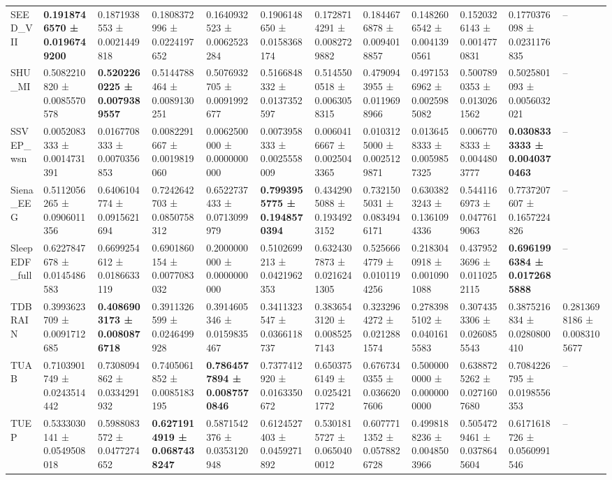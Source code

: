 \begin{table}[htbp]
\begin{tabular}{llllllllllll}
SEED_VII & \bfseries 0.1918746570 ± 0.0196749200 & 0.1871938553 ± 0.0021449818 & 0.1808372996 ± 0.0224197652 & 0.1640932523 ± 0.0062523284 & 0.1906148650 ± 0.0158368174 & 0.1728714291 ± 0.0082729882 & 0.1844676878 ± 0.0094018857 & 0.1482606542 ± 0.0041390561 & 0.1520326143 ± 0.0014770831 & 0.1770376098 ± 0.0231176835 & -- \\
SHU_MI & 0.5082210820 ± 0.0085570578 & \bfseries 0.5202260225 ± 0.0079389557 & 0.5144788464 ± 0.0089130251 & 0.5076932705 ± 0.0091992677 & 0.5166848332 ± 0.0137352597 & 0.5145500518 ± 0.0063058315 & 0.4790943955 ± 0.0119698966 & 0.4971536962 ± 0.0025985082 & 0.5007890353 ± 0.0130261562 & 0.5025801093 ± 0.0056032021 & -- \\
SSVEP_wsn & 0.0052083333 ± 0.0014731391 & 0.0167708333 ± 0.0070356853 & 0.0082291667 ± 0.0019819060 & 0.0062500000 ± 0.0000000000 & 0.0073958333 ± 0.0025558009 & 0.0060416667 ± 0.0025043365 & 0.0103125000 ± 0.0025129871 & 0.0136458333 ± 0.0059857325 & 0.0067708333 ± 0.0044803777 & \bfseries 0.0308333333 ± 0.0040370463 & -- \\
Siena_EEG & 0.5112056265 ± 0.0906011356 & 0.6406104774 ± 0.0915621694 & 0.7242642703 ± 0.0850758312 & 0.6522737433 ± 0.0713099979 & \bfseries 0.7993955775 ± 0.1948570394 & 0.4342905088 ± 0.1934923152 & 0.7321505031 ± 0.0834946171 & 0.6303823243 ± 0.1361094336 & 0.5441166973 ± 0.0477619063 & 0.7737207607 ± 0.1657224826 & -- \\
SleepEDF_full & 0.6227847678 ± 0.0145486583 & 0.6699254612 ± 0.0186633119 & 0.6901860154 ± 0.0077083032 & 0.2000000000 ± 0.0000000000 & 0.5102699213 ± 0.0421962353 & 0.6324307873 ± 0.0216241305 & 0.5256664779 ± 0.0101194256 & 0.2183040918 ± 0.0010901088 & 0.4379523696 ± 0.0110252115 & \bfseries 0.6961996384 ± 0.0172685888 & -- \\
TDBRAIN & 0.3993623709 ± 0.0091712685 & \bfseries 0.4086903173 ± 0.0080876718 & 0.3911326599 ± 0.0246499928 & 0.3914605346 ± 0.0159835467 & 0.3411323547 ± 0.0366118737 & 0.3836543120 ± 0.0085257143 & 0.3232964272 ± 0.0212881574 & 0.2783985102 ± 0.0401615583 & 0.3074353306 ± 0.0260855543 & 0.3875216834 ± 0.0280800410 & 0.2813698186 ± 0.0083105677 \\
TUAB & 0.7103901749 ± 0.0243514442 & 0.7308094862 ± 0.0334291932 & 0.7405061852 ± 0.0085183195 & \bfseries 0.7864577894 ± 0.0087570846 & 0.7377412920 ± 0.0163350672 & 0.6503756149 ± 0.0254211772 & 0.6767340355 ± 0.0366207606 & 0.5000000000 ± 0.0000000000 & 0.6388725262 ± 0.0271607680 & 0.7084226795 ± 0.0198556353 & -- \\
TUEP & 0.5333030141 ± 0.0549508018 & 0.5988083572 ± 0.0477274652 & \bfseries 0.6271914919 ± 0.0687438247 & 0.5871542376 ± 0.0353120948 & 0.6124527403 ± 0.0459271892 & 0.5301815727 ± 0.0650400012 & 0.6077711352 ± 0.0578826728 & 0.4998188236 ± 0.0048503966 & 0.5054729461 ± 0.0378645604 & 0.6171618726 ± 0.0560991546 & -- \\

\end{tabular}
\end{table}
